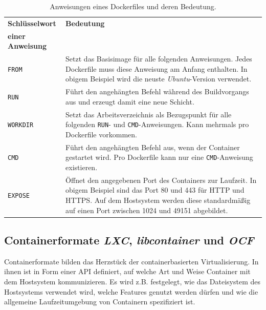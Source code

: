 \documentclass[../main.tex]{subfiles}
\begin{document}
			\vspace{0.5cm}
			\begin{table}[htp]
				\begin{centering}
				\begin{tabularx}{\textwidth}{>{\hsize=0.5\hsize}X|>{\hsize=1\hsize}X}
					\hline
					\textbf{Schlüsselwort} & \textbf{Bedeutung} \\
					\textbf{einer Anweisung} & \\
					\hline
					\texttt{FROM}
					& Setzt das Basisimage für alle folgenden Anweisungen. Jedes Dockerfile muss diese Anweisung am Anfang enthalten. In obigem Beispiel wird die neuste \emph{Ubuntu}-Version verwendet. \\
					\hline
					\texttt{RUN}
					& Führt den angehängten Befehl während des \gls{Build}vorgangs aus und erzeugt damit eine neue Schicht. \\
					\hline
					\texttt{WORKDIR}
					& Setzt das Arbeitsverzeichnis als Bezugspunkt für alle folgenden \texttt{RUN}- und \texttt{CMD}-Anweisungen. Kann mehrmals pro Dockerfile vorkommen. \\
					\hline
					\texttt{CMD}
					& Führt den angehängten Befehl aus, wenn der Container gestartet wird. Pro Dockerfile kann nur eine \texttt{CMD}-Anweisung existieren. \\
					\hline
					\texttt{EXPOSE}
					& Öffnet den angegebenen Port des Containers zur Laufzeit. In obigem Beispiel sind das Port 80 und 443 für \acrshort{HTTP} und \acrshort{HTTPS}. Auf dem Hostsystem werden diese standardmäßig auf einen Port zwischen 1024 und 49151 abgebildet. \\
					\hline
				\end{tabularx}
				\vspace{0.5cm}
				\caption{Anweisungen eines Dockerfiles und deren Bedeutung.}
				\label{tab:dockerfile}
				\end{centering}
			\end{table}



		\subsection{Containerformate \emph{\acrshort{LXC}}, \emph{libcontainer} und \emph{\acrshort{OCF}}}
		\label{dockerContainerformate}
			Containerformate bilden das Herzstück der containerbasierten Virtualisierung. In ihnen ist in Form einer \acrshort{API} definiert, auf welche Art und Weise Container mit dem Hostsystem kommunizieren. Es wird z.B. festgelegt, wie das Dateisystem des Hostsystems verwendet wird, welche Features genutzt werden dürfen und wie die allgemeine Laufzeitumgebung von Containern spezifiziert ist.
\end{document}
